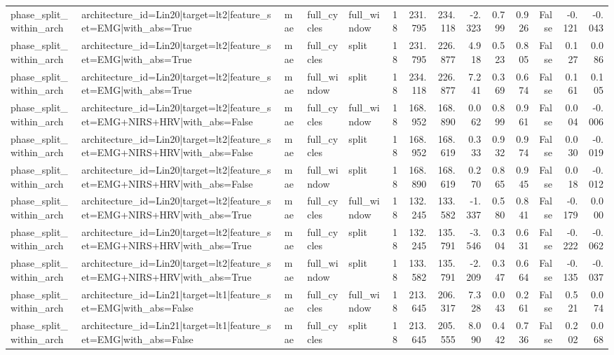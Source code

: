 \begin{table}
\begin{tabular}{lllllrrrrrrrrr}
phase_split_within_arch & architecture_id=Lin20|target=lt2|feature_set=EMG|with_abs=True & mae & full_cycles & full_window & 18 & 231.795 & 234.118 & -2.323 & 0.799 & 0.926 & False & -0.121 & -0.043 \\
phase_split_within_arch & architecture_id=Lin20|target=lt2|feature_set=EMG|with_abs=True & mae & full_cycles & split & 18 & 231.795 & 226.877 & 4.918 & 0.523 & 0.805 & False & 0.127 & 0.086 \\
phase_split_within_arch & architecture_id=Lin20|target=lt2|feature_set=EMG|with_abs=True & mae & full_window & split & 18 & 234.118 & 226.877 & 7.241 & 0.369 & 0.674 & False & 0.161 & 0.105 \\
phase_split_within_arch & architecture_id=Lin20|target=lt2|feature_set=EMG+NIRS+HRV|with_abs=False & mae & full_cycles & full_window & 18 & 168.952 & 168.890 & 0.062 & 0.899 & 0.961 & False & 0.004 & -0.006 \\
phase_split_within_arch & architecture_id=Lin20|target=lt2|feature_set=EMG+NIRS+HRV|with_abs=False & mae & full_cycles & split & 18 & 168.952 & 168.619 & 0.333 & 0.932 & 0.974 & False & 0.030 & -0.019 \\
phase_split_within_arch & architecture_id=Lin20|target=lt2|feature_set=EMG+NIRS+HRV|with_abs=False & mae & full_window & split & 18 & 168.890 & 168.619 & 0.270 & 0.865 & 0.945 & False & 0.018 & -0.012 \\
phase_split_within_arch & architecture_id=Lin20|target=lt2|feature_set=EMG+NIRS+HRV|with_abs=True & mae & full_cycles & full_window & 18 & 132.245 & 133.582 & -1.337 & 0.580 & 0.841 & False & -0.179 & 0.000 \\
phase_split_within_arch & architecture_id=Lin20|target=lt2|feature_set=EMG+NIRS+HRV|with_abs=True & mae & full_cycles & split & 18 & 132.245 & 135.791 & -3.546 & 0.304 & 0.631 & False & -0.222 & -0.062 \\
phase_split_within_arch & architecture_id=Lin20|target=lt2|feature_set=EMG+NIRS+HRV|with_abs=True & mae & full_window & split & 18 & 133.582 & 135.791 & -2.209 & 0.347 & 0.664 & False & -0.135 & -0.037 \\
phase_split_within_arch & architecture_id=Lin21|target=lt1|feature_set=EMG|with_abs=False & mae & full_cycles & full_window & 18 & 213.645 & 206.317 & 7.328 & 0.043 & 0.261 & False & 0.521 & 0.074 \\
phase_split_within_arch & architecture_id=Lin21|target=lt1|feature_set=EMG|with_abs=False & mae & full_cycles & split & 18 & 213.645 & 205.555 & 8.090 & 0.442 & 0.736 & False & 0.202 & 0.068 \\

\end{tabular}
\end{table}
